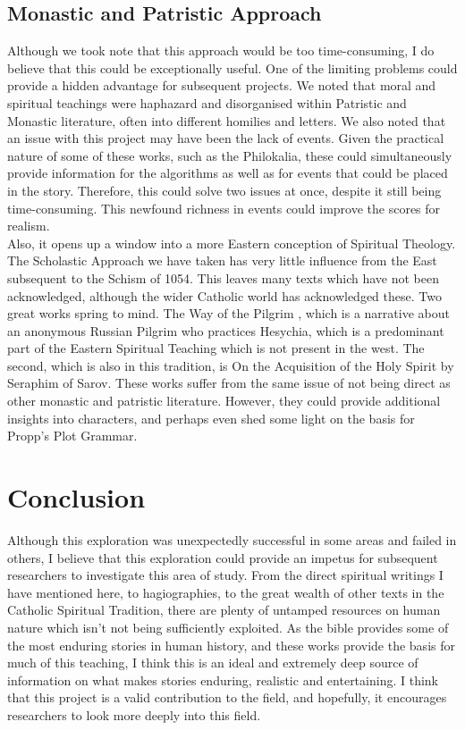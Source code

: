 \documentclass[12pt]{article}
\begin{document}
\subsection{Monastic and Patristic Approach}
Although we took note that this approach would be too time-consuming, I do believe that this could be exceptionally useful. One of the limiting problems could provide a hidden advantage for subsequent projects. We noted that moral and spiritual teachings were haphazard and disorganised within Patristic and Monastic literature, often into different homilies and letters. We also noted that an issue with this project may have been the lack of events. Given the practical nature of some of these works, such as the Philokalia, these could simultaneously provide information for the algorithms as well as for events that could be placed in the story. Therefore, this could solve two issues at once, despite it still being time-consuming. This newfound richness in events could improve the scores for realism. \\

Also, it opens up a window into a more Eastern conception of Spiritual Theology. The Scholastic Approach we have taken has very little influence from the East subsequent to the Schism of 1054. This leaves many texts which have not been acknowledged, although the wider Catholic world has acknowledged these. Two great works spring to mind. The Way of the Pilgrim \cite{helen1992way}, which is a narrative about an anonymous Russian Pilgrim who practices Hesychia, which is a predominant part of the Eastern Spiritual Teaching which is not present in the west. The second, which is also in this tradition, is On the Acquisition of the Holy Spirit by Seraphim of Sarov\cite{sarov2015acquisition}. These works suffer from the same issue of not being direct as other monastic and patristic literature. However, they could provide additional insights into characters, and perhaps even shed some light on the basis for Propp's Plot Grammar. 

\section{Conclusion}
Although this exploration was unexpectedly successful in some areas and failed in others, I believe that this exploration could provide an impetus for subsequent researchers to investigate this area of study. From the direct spiritual writings I have mentioned here, to hagiographies, to the great wealth of other texts in the Catholic Spiritual Tradition, there are plenty of untamped resources on human nature which isn't not being sufficiently exploited. As the bible provides some of the most enduring stories in human history, and these works provide the basis for much of this teaching, I think this is an ideal and extremely deep source of information on what makes stories enduring, realistic and entertaining. I think that this project is a valid contribution to the field, and hopefully, it encourages researchers to look more deeply into this field. 
\end{document}
